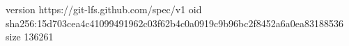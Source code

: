 version https://git-lfs.github.com/spec/v1
oid sha256:15d703cea4c41099491962c03f62b4c0a0919c9b96bc2f8452a6a0ea83188536
size 136261
